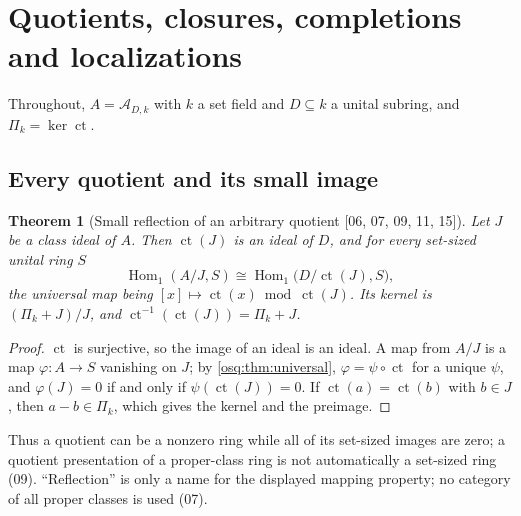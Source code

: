 \documentclass[11pt,letterpaper]{article}
\numberwithin{equation}{section}
\newtheorem{theorem}{Theorem}[section]
\theoremstyle{definition}
\theoremstyle{remark}
\theoremstyle{plain}
\newcommand{\A}{\mathcal A}          %
\newcommand{\ct}{\operatorname{ct}}
\newcommand{\Homone}{\operatorname{Hom}_1}
\newcommand{\src}[1]{\textup{\textsf{[#1]}}}
\begin{document}
\section{Quotients, closures, completions and localizations}\label{osq:sec:quotients}

Throughout, $A=\A_{D,k}$ with $k$ a set field and $D\subseteq k$ a unital subring,
and $\Pi_k=\ker\ct$.

\subsection{Every quotient and its small image}\label{osq:sub:allquotients}

\begin{theorem}[Small reflection of an arbitrary quotient \src{06, 07, 09, 11, 15}]\label{osq:thm:reflection}
Let $J$ be a class ideal of $A$. Then $\ct(J)$ is an ideal of $D$, and for every
set-sized unital ring $S$
\[
 \Homone(A/J,S)\cong\Homone\bigl(D/\ct(J),S\bigr),
\]
the universal map being $[x]\mapsto\ct(x)\bmod\ct(J)$. Its kernel is $(\Pi_k+J)/J$, and
$\ct^{-1}(\ct(J))=\Pi_k+J$.
\end{theorem}
\begin{proof}
$\ct$ is surjective, so the image of an ideal is an ideal. A map from $A/J$ is a map
$\varphi:A\to S$ vanishing on $J$; by \cref{osq:thm:universal},
$\varphi=\psi\circ\ct$ for a unique $\psi$, and $\varphi(J)=0$ if and only if
$\psi(\ct(J))=0$. If $\ct(a)=\ct(b)$ with $b\in J$, then $a-b\in\Pi_k$, which gives the
kernel and the preimage.
\end{proof}

Thus a quotient can be a nonzero ring while all of its set-sized images are zero; a
quotient presentation of a proper-class ring is not automatically a set-sized ring (09).
``Reflection'' is only a name for the displayed mapping property; no category of all proper
classes is used (07).
\end{document}
